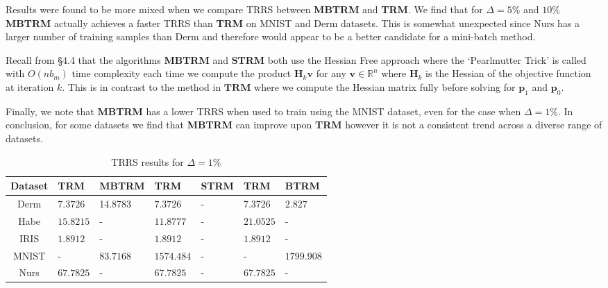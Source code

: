 \documentclass[letterpaper,12pt,titlepage,oneside,final]{book}
\begin{document}
	Results were found to be more mixed when we compare TRRS between \textbf{MBTRM} and \textbf{TRM}. We find that for $\Delta = 5\%$ and $10\%$ \textbf{MBTRM} actually achieves a faster TRRS than \textbf{TRM} on MNIST and Derm datasets. This is somewhat unexpected since Nurs has a larger number of training samples than Derm and therefore would appear to be a better candidate for a mini-batch method. 
	
	Recall from \S4.4 that the algorithms \textbf{MBTRM} and \textbf{STRM} both use the Hessian Free approach where the `Pearlmutter Trick' is called with $O(nb_{m})$ time complexity each time we compute the product $\mathbf{H}_{k}\mathbf{v}$ for any $\mathbf{v} \in \mathbb{R}^{n}$ where $\mathbf{H}_{k}$ is the Hessian of the objective function at iteration $k$. This is in contrast to the method in $\mathbf{TRM}$ where we compute the Hessian matrix fully before solving for $\mathbf{p}_{1}$ and $\mathbf{p}_{0}$. 
	
	Finally, we note that \textbf{MBTRM} has a lower TRRS when used to train using the MNIST dataset, even for the case when $\Delta = 1\%$. In conclusion, for some datasets we find that \textbf{MBTRM} can improve upon \textbf{TRM} however it is not a consistent trend across a diverse range of datasets.
	
	\begin{table}[h] 
		\centering 
		\begin{tabular}{ |c||l|l||l|l||l|l| } 
			\hline 
			\textbf{Dataset} & \textbf{TRM} & \textbf{MBTRM} & \textbf{TRM} & \textbf{STRM} & \textbf{TRM} & \textbf{BTRM} \\ 
			\hline 
			\hline 
			Derm & $\mathbf{7.3726}$ &14.8783 & $\mathbf{7.3726}$ & - &7.3726 & $\mathbf{2.827}$\\ 
			\hline 
			Habe & $\mathbf{15.8215}$ & - & $\mathbf{11.8777}$ & - & $\mathbf{21.0525}$ & -\\ 
			\hline 
			IRIS & $\mathbf{1.8912}$ & - & $\mathbf{1.8912}$ & - & $\mathbf{1.8912}$ & -\\ 
			\hline 
			MNIST & - & $\mathbf{83.7168}$ & $\mathbf{1574.484}$ & - & - & $\mathbf{1799.908}$\\ 
			\hline 
			Nurs & $\mathbf{67.7825}$ & - & $\mathbf{67.7825}$ & - & $\mathbf{67.7825}$ & -\\ 
			\hline 
		\end{tabular} 
		\caption{TRRS results for $\Delta = 1 \%$} \label{SMBTRMTRM1}  \end{table}
	
\end{document}
